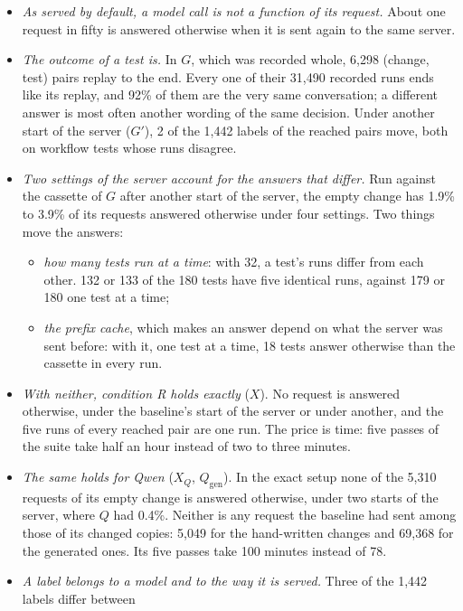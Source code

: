 \documentclass[11pt,a4paper]{article}
\begin{document}
\begin{itemize}
  \item \emph{As served by default, a model call is not a function of its request.} About one request in fifty is
        answered otherwise when it is sent again to the same server.
  \item \emph{The outcome of a test is.} In $G$, which was recorded whole, 6,298 (change, test) pairs replay to the
        end. Every one of their 31,490 recorded runs ends like its replay, and 92\% of them are the very same
        conversation; a different answer is most often another wording of the same decision. Under another start
        of the server ($G'$), 2 of the 1,442 labels of the reached pairs move, both on workflow tests whose runs
        disagree.
  \item \emph{Two settings of the server account for the answers that differ.} Run against the cassette of $G$
        after another start of the server, the empty change has 1.9\% to 3.9\% of its requests answered otherwise
        under four settings. Two things move the answers:
        \begin{itemize}
          \item \emph{how many tests run at a time}: with 32, a test's runs differ from each other. 132 or 133 of
                the 180 tests have five identical runs, against 179 or 180 one test at a time;
          \item \emph{the prefix cache}, which makes an answer depend on what the server was sent before: with it,
                one test at a time, 18 tests answer otherwise than the cassette in every run.
        \end{itemize}
  \item \emph{With neither, condition R holds exactly} ($X$). No request is answered otherwise, under the
        baseline's start of the server or under another, and the five runs of every reached pair are one run.
        The price is time: five passes of the suite take half an hour instead of two to three minutes.
  \item \emph{The same holds for Qwen} ($X_Q$, $Q_{\mathrm{gen}}$). In the exact setup none of the 5,310 requests
        of its empty change is answered otherwise, under two starts of the server, where $Q$ had 0.4\%. Neither is
        any request the baseline had sent among those of its changed copies: 5,049 for the hand-written changes
        and 69,368 for the generated ones. Its five passes take 100 minutes instead of 78.
  \item \emph{A label belongs to a model and to the way it is served.} Three of the 1,442 labels differ between

\end{itemize}
\end{document}
